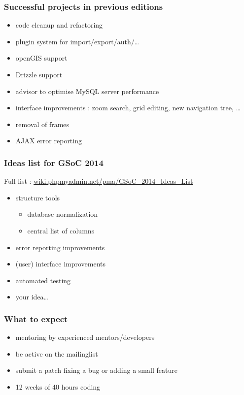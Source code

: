 \documentclass[14pt]{beamer}
\begin{document}
  \begin{frame}
    \frametitle{Successful projects in previous editions}
    \begin{itemize}
      \item code cleanup and refactoring
      \item plugin system for import/export/auth/\ldots
      \item openGIS support
      \item Drizzle support
      \item advisor to optimise MySQL server performance
      \item interface improvements : zoom search, grid editing, new navigation tree, \ldots
      \item removal of frames
      \item AJAX error reporting 
    \end{itemize}
  \end{frame}
  \begin{frame}
    \frametitle{Ideas list for GSoC 2014}
    Full list :
    \href{http://wiki.phpmyadmin.net/pma/GSoC\_2014\_Ideas\_List}{wiki.phpmyadmin.net/pma/GSoC\_2014\_Ideas\_List}
    \begin{itemize}
      \item structure tools 
      \begin{itemize}
        \item database normalization
        \item central list of columns
      \end{itemize}
      \item error reporting improvements
      \item (user) interface improvements
      \item automated testing
      \item your idea\ldots
    \end{itemize}
  \end{frame}
  \begin{frame}
    \frametitle{What to expect}
    \begin{itemize}
      \item mentoring by experienced mentors/developers
      \item be active on the mailinglist
      \item submit a patch fixing a bug or adding a small feature
      \item 12 weeks of 40 hours coding
    \end{itemize}
 \end{frame}
\end{document}
